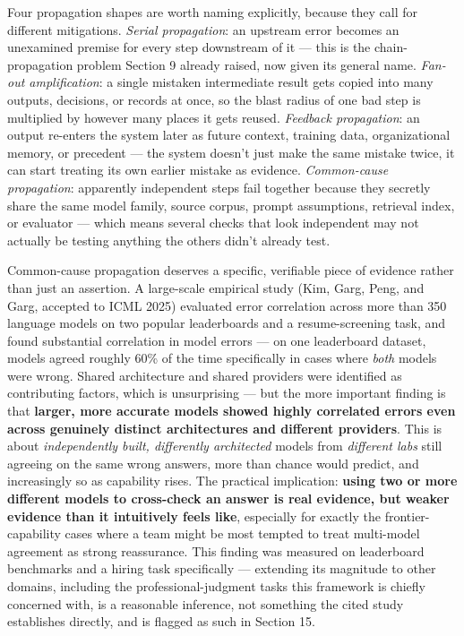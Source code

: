 Four propagation shapes are worth naming explicitly, because they call for different mitigations. \emph{Serial propagation}: an upstream error becomes an unexamined premise for every step downstream of it --- this is the chain-propagation problem Section 9 already raised, now given its general name. \emph{Fan-out amplification}: a single mistaken intermediate result gets copied into many outputs, decisions, or records at once, so the blast radius of one bad step is multiplied by however many places it gets reused. \emph{Feedback propagation}: an output re-enters the system later as future context, training data, organizational memory, or precedent --- the system doesn't just make the same mistake twice, it can start treating its own earlier mistake as evidence. \emph{Common-cause propagation}: apparently independent steps fail together because they secretly share the same model family, source corpus, prompt assumptions, retrieval index, or evaluator --- which means several checks that look independent may not actually be testing anything the others didn't already test.

Common-cause propagation deserves a specific, verifiable piece of evidence rather than just an assertion. A large-scale empirical study (Kim, Garg, Peng, and Garg, accepted to ICML 2025) evaluated error correlation across more than 350 language models on two popular leaderboards and a resume-screening task, and found substantial correlation in model errors --- on one leaderboard dataset, models agreed roughly 60\% of the time specifically in cases where \emph{both} models were wrong. Shared architecture and shared providers were identified as contributing factors, which is unsurprising --- but the more important finding is that \textbf{larger, more accurate models showed highly correlated errors even across genuinely distinct architectures and different providers}. This is about \emph{independently built, differently architected} models from \emph{different labs} still agreeing on the same wrong answers, more than chance would predict, and increasingly so as capability rises. The practical implication: \textbf{using two or more different models to cross-check an answer is real evidence, but weaker evidence than it intuitively feels like}, especially for exactly the frontier-capability cases where a team might be most tempted to treat multi-model agreement as strong reassurance. This finding was measured on leaderboard benchmarks and a hiring task specifically --- extending its magnitude to other domains, including the professional-judgment tasks this framework is chiefly concerned with, is a reasonable inference, not something the cited study establishes directly, and is flagged as such in Section 15.

